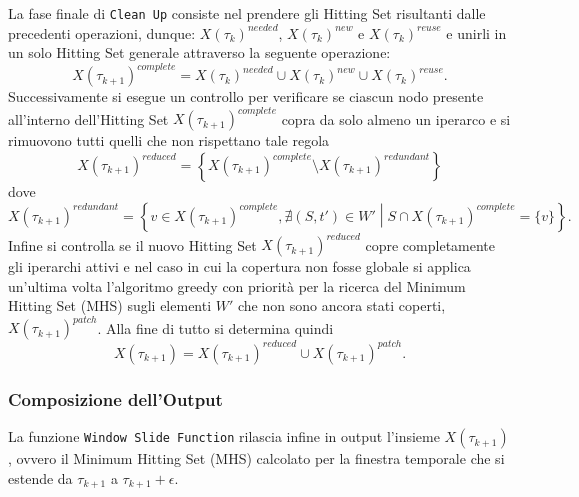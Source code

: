 La fase finale di \texttt{Clean Up} consiste nel prendere gli Hitting Set risultanti dalle precedenti operazioni, dunque: $X{(\tau_k)}^{needed}$, $X{(\tau_k)}^{new}$ e $X{(\tau_k)}^{reuse}$ e unirli in un solo Hitting Set generale attraverso la seguente operazione:
\[
X{(\tau_{k+1})}^{complete} = X{(\tau_k)}^{needed} \cup X{(\tau_k)}^{new} \cup X{(\tau_k)}^{reuse}.
\]
Successivamente si esegue un controllo per verificare se ciascun nodo presente all'interno dell'Hitting Set $X{(\tau_{k+1})}^{complete}$ copra da solo almeno un iperarco e si rimuovono tutti quelli che non rispettano tale regola
\[
X{(\tau_{k+1})}^{reduced} =\left\{ X{(\tau_{k+1})}^{complete} \setminus X{(\tau_{k+1})}^{redundant} \right\}
\]
dove
\[
X{(\tau_{k+1})}^{redundant} = \left\{v\in X{(\tau_{k+1})}^{complete},\nexists (S,t')\in W' \middle| S\cap X{(\tau_{k+1})}^{complete}=\{v\}\right\}.
\]
Infine si controlla se il nuovo Hitting Set $X{(\tau_{k+1})}^{reduced}$ copre completamente gli iperarchi attivi e nel caso in cui la copertura non fosse globale si applica un'ultima volta l'algoritmo greedy con priorità per la ricerca del Minimum Hitting Set (MHS) sugli elementi $W'$ che non sono ancora stati coperti, $X{(\tau_{k+1})}^{patch}$.
Alla fine di tutto si determina quindi
\[
X{(\tau_{k+1})} = X{(\tau_{k+1})}^{reduced} \cup X{(\tau_{k+1})}^{patch}.
\]

\subsubsection*{Composizione dell'Output}
La funzione \texttt{Window Slide Function} rilascia infine in output l'insieme $X{(\tau_{k+1})}$, ovvero il Minimum Hitting Set (MHS) calcolato per la finestra temporale che si estende da $\tau_{k+1}$ a $\tau_{k+1}+\epsilon$.